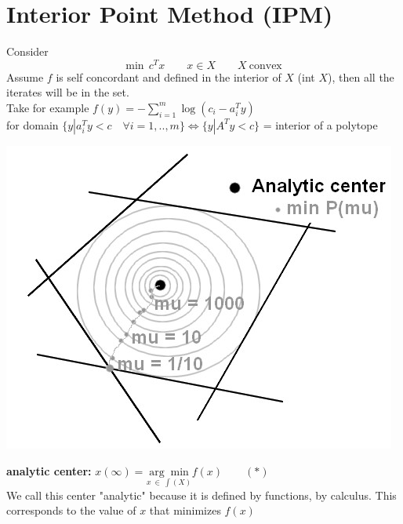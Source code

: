 \section{Interior Point Method (IPM)}
Consider 
$$ \text{min} ~~ c^T x \qquad x \in X \qquad X \ \text{convex}$$
Assume $f$ is self concordant and defined in the interior of $X$ (int $X$), then all the iterates will be in the set.\\
Take for example $f(y) = - \sum_{i = 1}^m \log(c_i - a_i^T y)$\\ for domain $\lbrace y | a_i^T y < c\quad \forall i = 1,..,m \rbrace \Longleftrightarrow \lbrace y | A^T y < c  \rbrace$ = interior of a polytope\\
\begin{center}
\includegraphics[scale=0.5]{images/12-fig1.jpg} 
\end{center}

\begin{definition} 
\textbf{analytic center:} $x(\infty) = \underset{x\ \in \ \int(X)}{\arg \min} f(x) \qquad (*)$  \\
We call this center "analytic" because it is defined by functions, by calculus. This corresponds to the value of $x$ that minimizes $f(x)$
\end{definition}

